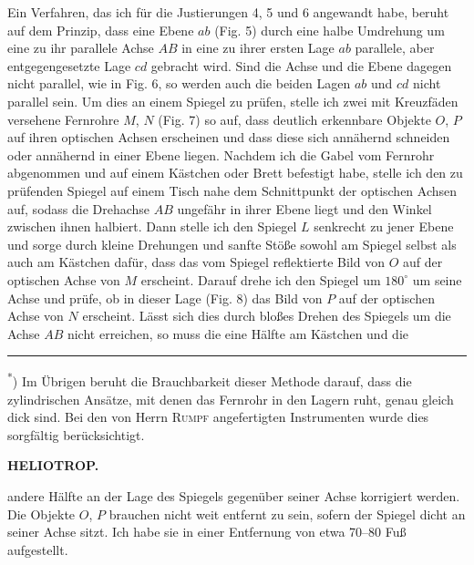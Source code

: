 \par\noindent\hspace*{\parindent}Ein Verfahren, das ich für die Justierungen 4, 5 und 6 angewandt habe, beruht auf dem Prinzip, dass eine Ebene $ab$ (Fig. 5) durch eine halbe Umdrehung um eine zu ihr parallele Achse $AB$ in eine zu ihrer ersten Lage $ab$ parallele, aber entgegengesetzte Lage $cd$ gebracht wird. Sind die Achse und die Ebene dagegen nicht parallel, wie in Fig. 6, so werden auch die beiden Lagen $ab$ und $cd$ nicht parallel sein. Um dies an einem Spiegel zu prüfen, stelle ich zwei mit Kreuzfäden versehene Fernrohre $M$, $N$ (Fig. 7) so auf, dass deutlich erkennbare Objekte $O$, $P$ auf ihren optischen Achsen erscheinen und dass diese sich annähernd schneiden oder annähernd in einer Ebene liegen. Nachdem ich die Gabel vom Fernrohr abgenommen und auf einem Kästchen oder Brett befestigt habe, stelle ich den zu prüfenden Spiegel auf einem Tisch nahe dem Schnittpunkt der optischen Achsen auf, sodass die Drehachse $AB$ ungefähr in ihrer Ebene liegt und den Winkel zwischen ihnen halbiert. Dann stelle ich den Spiegel $L$ senkrecht zu jener Ebene und sorge durch kleine Drehungen und sanfte Stöße sowohl am Spiegel selbst als auch am Kästchen dafür, dass das vom Spiegel reflektierte Bild von $O$ auf der optischen Achse von $M$ erscheint. Darauf drehe ich den Spiegel um $180^\circ$ um seine Achse und prüfe, ob in dieser Lage (Fig. 8) das Bild von $P$ auf der optischen Achse von $N$ erscheint. Lässt sich dies durch bloßes Drehen des Spiegels um die Achse $AB$ nicht erreichen, so muss die eine Hälfte am Kästchen und die
\par\medskip\noindent\rule{4cm}{.4pt}\par
\begingroup\footnotesize\noindent\hspace*{\parindent}\textsuperscript{*}) Im Übrigen beruht die Brauchbarkeit dieser Methode darauf, dass die zylindrischen Ansätze, mit denen das Fernrohr in den Lagern ruht, genau gleich dick sind. Bei den von Herrn \textsc{Rumpf} angefertigten Instrumenten wurde dies sorgfältig berücksichtigt.\par\endgroup
\par\medskip\noindent{}\par

\par\clearpage
\noindent{}\hfill{\small\textbf{HELIOTROP.}}\hfill\null\par\medskip
\noindent andere Hälfte an der Lage des Spiegels gegenüber seiner Achse korrigiert werden. Die Objekte $O$, $P$ brauchen nicht weit entfernt zu sein, sofern der Spiegel dicht an seiner Achse sitzt. Ich habe sie in einer Entfernung von etwa 70--80 Fuß aufgestellt.

